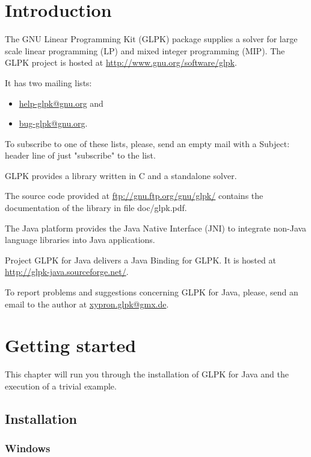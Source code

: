 \documentclass[a4paper,11pt]{report}
\begin{document}
\tableofcontents

\chapter{Introduction}
The GNU Linear Programming Kit (GLPK)\cite{GLPK} package supplies a solver for
large scale linear programming (LP) and mixed integer programming (MIP). The
GLPK project is hosted at
\linebreak\href{http://www.gnu.org/software/glpk}{http://www.gnu.org/software/glpk}.

It has two mailing lists:
\begin{itemize}
\item\href{mailto:help-glpk@gnu.org}{help-glpk@gnu.org} and 
\item\href{mailto:bug-glpk@gnu.org}{bug-glpk@gnu.org}.
\end{itemize}
To subscribe to one of these lists, please, send an empty mail with a Subject: header line of just "subscribe" to the list.

GLPK provides a library written in C and a standalone solver.

The source code provided at \href{ftp://gnu.ftp.org/gnu/glpk/}{ftp://gnu.ftp.org/gnu/glpk/} contains the documentation of the library in  file doc/glpk.pdf.

The Java platform provides the Java Native Interface (JNI)\cite{JNI} to integrate non-Java language libraries into Java applications.

Project GLPK for Java delivers a Java Binding for GLPK. It is hosted at \linebreak\href{http://glpk-java.sourceforge.net/}{http://glpk-java.sourceforge.net/}.

To report problems and suggestions concerning GLPK for Java, please, send an email to the author at \href{mailto:xypron.glpk@gmx.de}{xypron.glpk@gmx.de}.

\chapter{Getting started}

This chapter will run you through the installation of GLPK for Java and the execution of a trivial example.

\section{Installation}
\subsection{Windows}
\end{document}
